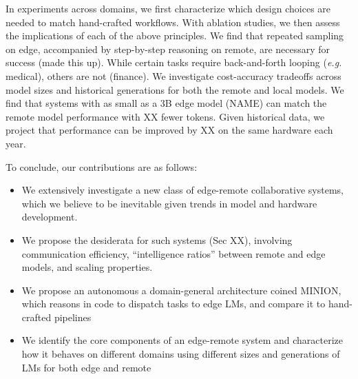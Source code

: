 In experiments across domains, we first characterize which design choices are needed to match hand-crafted workflows. 
With ablation studies, we then assess the implications of each of the above principles. We find that repeated sampling on edge, accompanied by step-by-step reasoning on remote, are necessary for success (made this up). While certain tasks require back-and-forth looping (\textit{e.g.} medical), others are not (finance).
We investigate cost-accuracy tradeoffs across model sizes and historical generations for both the remote and local models. We find that systems with as small as a 3B edge model (NAME) can match the remote model performance with XX fewer tokens. Given historical data, we project that performance can be improved by XX on the same hardware each year. 

To conclude, our contributions are as follows: 
\begin{itemize}
    \item We extensively investigate a new class of edge-remote collaborative systems, which we believe to be inevitable given trends in model and hardware development.
    \item We propose the desiderata for such systems (Sec XX), involving communication efficiency, “intelligence ratios” between remote and edge models, and scaling properties.
    \item We propose an autonomous a domain-general architecture coined MINION, which reasons in code to dispatch tasks to edge LMs, and compare it to hand-crafted pipelines
    \item We identify the core components of an edge-remote system and characterize how it behaves on different domains using different sizes and generations of LMs for both edge and remote
\end{itemize}
